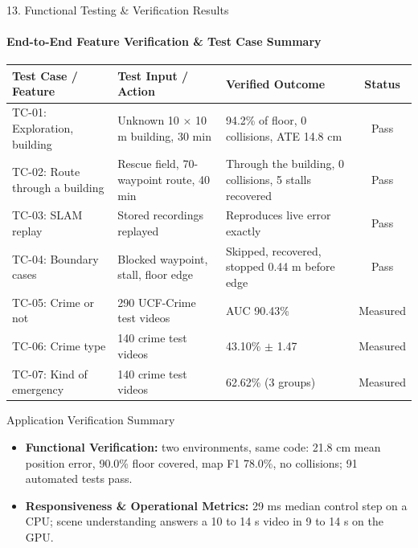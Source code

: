 \documentclass[aspectratio=169, 11pt]{beamer}
\begin{document}
\begin{frame}{13. Functional Testing \& Verification Results}
    \framesubtitle{End-to-End Feature Verification \& Test Case Summary}
    \begin{table}
        \centering
        \scriptsize
        \renewcommand{\arraystretch}{1.15}
        \begin{tabular}{p{3.3cm} p{3.4cm} p{4.6cm} c}
            \toprule
            \textbf{Test Case / Feature} & \textbf{Test Input / Action} & \textbf{Verified Outcome} & \textbf{Status} \\
            \midrule
            TC-01: Exploration, building & Unknown 10 $\times$ 10 m building, 30 min & 94.2\% of floor, 0 collisions, ATE 14.8 cm & Pass \\
            TC-02: Route through a building & Rescue field, 70-waypoint route, 40 min & Through the building, 0 collisions, 5 stalls recovered & Pass \\
            TC-03: SLAM replay & Stored recordings replayed & Reproduces live error exactly & Pass \\
            TC-04: Boundary cases & Blocked waypoint, stall, floor edge & Skipped, recovered, stopped 0.44 m before edge & Pass \\
            TC-05: Crime or not & 290 UCF-Crime test videos & AUC 90.43\% & Measured \\
            TC-06: Crime type & 140 crime test videos & 43.10\% $\pm$ 1.47 & Measured \\
            TC-07: Kind of emergency & 140 crime test videos & 62.62\% (3 groups) & Measured \\
            \bottomrule
        \end{tabular}
    \end{table}

    \begin{block}{Application Verification Summary}
        \scriptsize
        \begin{itemize}
            \item \textbf{Functional Verification:} two environments, same code: 21.8 cm mean position error, 90.0\% floor covered, map F1 78.0\%, no collisions; 91 automated tests pass.
            \item \textbf{Responsiveness \& Operational Metrics:} 29 ms median control step on a CPU; scene understanding answers a 10 to 14 s video in 9 to 14 s on the GPU.
        \end{itemize}
    \end{block}
\end{frame}
\end{document}
